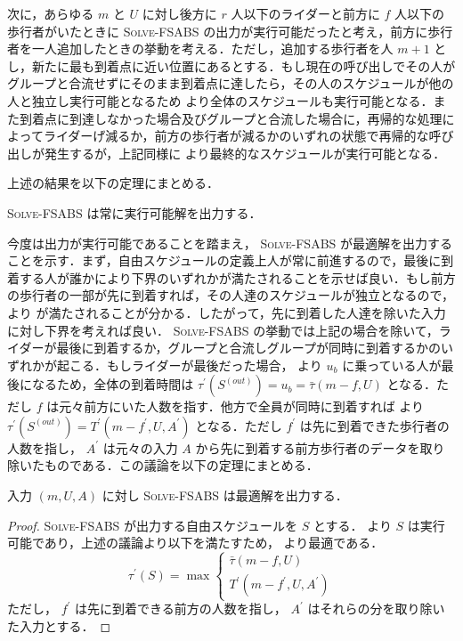 次に，あらゆる $m$ と $U$ に対し後方に $r$ 人以下のライダーと前方に $f$ 人以下の歩行者がいたときに \textsc{Solve-FSABS} の出力が実行可能だったと考え，前方に歩行者を一人追加したときの挙動を考える．ただし，追加する歩行者を人 $m + 1$ とし，新たに最も到着点に近い位置にあるとする．もし現在の呼び出しでその人がグループと合流せずにそのまま到着点に達したら，その人のスケジュールが他の人と独立し実行可能となるため  より全体のスケジュールも実行可能となる．また到着点に到達しなかった場合及びグループと合流した場合に，再帰的な処理によってライダーげ減るか，前方の歩行者が減るかのいずれの状態で再帰的な呼び出しが発生するが，上記同様に  より最終的なスケジュールが実行可能となる．

上述の結果を以下の定理にまとめる．

\begin{theorem}\label{theorem:solve-fsabs-is-feasible}
  \textsc{Solve-FSABS} は常に実行可能解を出力する．
\end{theorem}

今度は出力が実行可能であることを踏まえ， \textsc{Solve-FSABS} が最適解を出力することを示す．まず，自由スケジュールの定義上人が常に前進するので，最後に到着する人が誰かにより下界のいずれかが満たされることを示せば良い．もし前方の歩行者の一部が先に到着すれば，その人達のスケジュールが独立となるので，  より  が満たされることが分かる．したがって，先に到着した人達を除いた入力に対し下界を考えれば良い． \textsc{Solve-FSABS} の挙動では上記の場合を除いて，ライダーが最後に到着するか，グループと合流しグループが同時に到着するかのいずれかが起こる．もしライダーが最後だった場合，  より $u_b$ に乗っている人が最後になるため，全体の到着時間は $\tau^\prime(S^{(out)}) = u_b = \bar\tau(m - f, U)$ となる．ただし $f$ は元々前方にいた人数を指す．他方で全員が同時に到着すれば  より $\tau^\prime(S^{(out)}) = T^\prime(m - f^\prime, U, A^\prime)$ となる．ただし $f^\prime$ は先に到着できた歩行者の人数を指し， $A^{\prime}$ は元々の入力 $A$ から先に到着する前方歩行者のデータを取り除いたものである．この議論を以下の定理にまとめる．

\begin{theorem}
  入力 $(m, U, A)$ に対し \textsc{Solve-FSABS} は最適解を出力する．
\end{theorem}
\begin{proof}
  \textsc{Solve-FSABS} が出力する自由スケジュールを $S$ とする．  より $S$ は実行可能であり，上述の議論より以下を満たすため，  より最適である．
  \begin{equation}
    \tau^\prime(S) = \max \begin{cases}
      \bar\tau(m - f, U) \\
      T^\prime(m - f^\prime, U, A^\prime)
    \end{cases}
  \end{equation}
  ただし， $f^\prime$ は先に到着できる前方の人数を指し， $A^\prime$ はそれらの分を取り除いた入力とする．
\end{proof}


